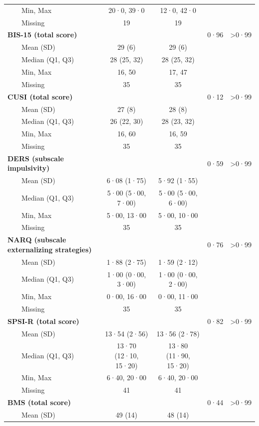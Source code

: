 \documentclass[
  super,
  preprint,
  1p,
  onecolumn]{elsarticle}
\begin{document}
\begin{table}
{\begin{tabular*}{\linewidth}{@{\extracolsep{\fill}}lcccc}
    Min, Max & 20·0, 39·0 & 12·0, 42·0 &  &  \\ 
    Missing & 19 & 19 &  &  \\ 
{\bfseries BIS-15 (total score)} &  &  & 0·96 & >0·99 \\ 
    Mean (SD) & 29 (6) & 29 (6) &  &  \\ 
    Median (Q1, Q3) & 28 (25, 32) & 28 (25, 32) &  &  \\ 
    Min, Max & 16, 50 & 17, 47 &  &  \\ 
    Missing & 35 & 35 &  &  \\ 
{\bfseries CUSI (total score)} &  &  & 0·12 & >0·99 \\ 
    Mean (SD) & 27 (8) & 28 (8) &  &  \\ 
    Median (Q1, Q3) & 26 (22, 30) & 28 (23, 32) &  &  \\ 
    Min, Max & 16, 60 & 16, 59 &  &  \\ 
    Missing & 35 & 35 &  &  \\ 
{\bfseries DERS (subscale impulsivity)} &  &  & 0·59 & >0·99 \\ 
    Mean (SD) & 6·08 (1·75) & 5·92 (1·55) &  &  \\ 
    Median (Q1, Q3) & 5·00 (5·00, 7·00) & 5·00 (5·00, 6·00) &  &  \\ 
    Min, Max & 5·00, 13·00 & 5·00, 10·00 &  &  \\ 
    Missing & 35 & 35 &  &  \\ 
{\bfseries NARQ (subscale externalizing strategies)} &  &  & 0·76 & >0·99 \\ 
    Mean (SD) & 1·88 (2·75) & 1·59 (2·12) &  &  \\ 
    Median (Q1, Q3) & 1·00 (0·00, 3·00) & 1·00 (0·00, 2·00) &  &  \\ 
    Min, Max & 0·00, 16·00 & 0·00, 11·00 &  &  \\ 
    Missing & 35 & 35 &  &  \\ 
{\bfseries SPSI-R (total score)} &  &  & 0·82 & >0·99 \\ 
    Mean (SD) & 13·54 (2·56) & 13·56 (2·78) &  &  \\ 
    Median (Q1, Q3) & 13·70 (12·10, 15·20) & 13·80 (11·90, 15·20) &  &  \\ 
    Min, Max & 6·40, 20·00 & 6·40, 20·00 &  &  \\ 
    Missing & 41 & 41 &  &  \\ 
{\bfseries BMS (total score)} &  &  & 0·44 & >0·99 \\ 
    Mean (SD) & 49 (14) & 48 (14) &  &  \\ 

\end{tabular*}}
\end{table}
\end{document}
